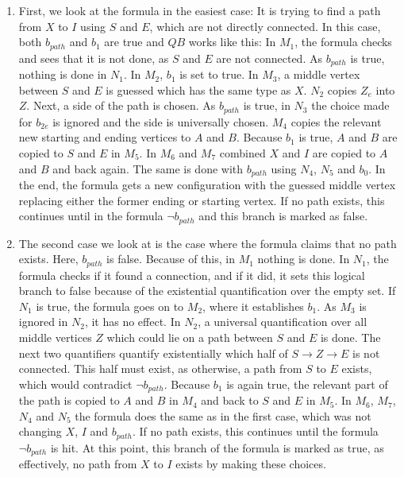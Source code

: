 \begin{enumerate}
    \item First, we look at the formula in the easiest case: It is trying to find a path from $X$ to $I$ using $S$ and $E$, which are not directly connected.
    In this case, both $b_{path}$ and $b_1$ are true and $QB$ works like this:
    In $M_1$, the formula checks and sees that it is not done, as $S$ and $E$ are not connected.
    As $b_{path}$ is true, nothing is done in $N_1$.
    In $M_2$, $b_1$ is set to true.
    In $M_3$, a middle vertex between $S$ and $E$ is guessed which has the same type as $X$.
    $N_2$ copies $Z_e$ into $Z$.
    Next, a side of the path is chosen.
    As $b_{path}$ is true, in $N_3$ the choice made for $b_{2e}$ is ignored and the side is universally chosen.
    $M_4$ copies the relevant new starting and ending vertices to $A$ and $B$.
    Because $b_1$ is true, $A$ and $B$ are copied to $S$ and $E$ in $M_5$.
    In $M_6$ and $M_7$ combined  $X$ and $I$ are copied to $A$ and $B$ and back again.
    The same is done with $b_{path}$ using $N_4$, $N_5$ and $b_0$.
    In the end, the formula gets a new configuration with the guessed middle vertex replacing either the former ending or starting vertex.
    If no path exists, this continues until in the formula $\neg b_{path}$ and this branch is marked as false.

    \item The second case we look at is the case where the formula claims that no path exists.
    Here, $b_{path}$ is false.
    Because of this, in $M_1$ nothing is done.
    In $N_1$, the formula checks if it found a connection, and if it did, it sets this logical branch to false because of the existential quantification over the empty set.
    If $N_1$ is true, the formula goes on to $M_2$, where it establishes $b_1$.
    As $M_3$ is ignored in $N_2$, it has no effect.
    In $N_2$, a universal quantification over all middle vertices $Z$ which could lie on a path between $S$ and $E$ is done.
    The next two quantifiers quantify existentially which half of $S \to Z \to E$ is not connected.
    This half must exist, as otherwise, a path from $S$ to $E$ exists, which would contradict $\neg b_{path}$.
    Because $b_1$ is again true, the relevant part of the path is copied to $A$ and $B$ in $M_4$ and back to $S$ and $E$ in $M_5$.
    In $M_6$, $M_7$, $N_4$ and $N_5$ the formula does the same as in the first case, which was not changing $X$, $I$ and $b_{path}$.
    If no path exists, this continues until the formula $\neg b_{path}$ is hit.
    At this point, this branch of the formula is marked as true, as effectively, no path from $X$ to $I$ exists by making these choices.


\end{enumerate}
